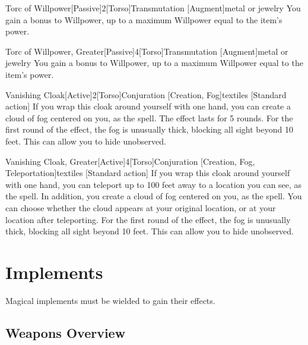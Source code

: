 \begin{magicitemdef}{Torc of Willpower}[Passive]{2}[Torso]{Transmutation [Augment]}{metal or jewelry}
     You gain a  bonus to Willpower, up to a maximum Willpower equal to the item's power.
\end{magicitemdef}

\begin{magicitemdef}{Torc of Willpower, Greater}[Passive]{4}[Torso]{Transmutation [Augment]}{metal or jewelry}
     You gain a  bonus to Willpower, up to a maximum Willpower equal to the item's power.
\end{magicitemdef}

\begin{magicitemdef}{Vanishing Cloak}[Active]{2}[Torso]{Conjuration [Creation, Fog]}{textiles}
    [Standard action] If you wrap this cloak around yourself with one hand, you can create a cloud of fog centered on you, as the  spell.
    The effect lasts for 5 rounds.
    For the first round of the effect, the fog is unusually thick, blocking all sight beyond 10 feet.
    This can allow you to hide unobserved.
\end{magicitemdef}

\begin{magicitemdef}{Vanishing Cloak, Greater}[Active]{4}[Torso]{Conjuration [Creation, Fog, Teleportation]}{textiles}
    [Standard action] If you wrap this cloak around yourself with one hand, you can teleport up to 100 feet away to a location you can see, as the  spell.
    In addition, you create a cloud of fog centered on you, as the  spell.
    You can choose whether the cloud appears at your original location, or at your location after teleporting.
    For the first round of the effect, the fog is unusually thick, blocking all sight beyond 10 feet.
    This can allow you to hide unobserved.
\end{magicitemdef}

\section{Implements}
Magical implements must be wielded to gain their effects.

\subsection{Weapons Overview}

